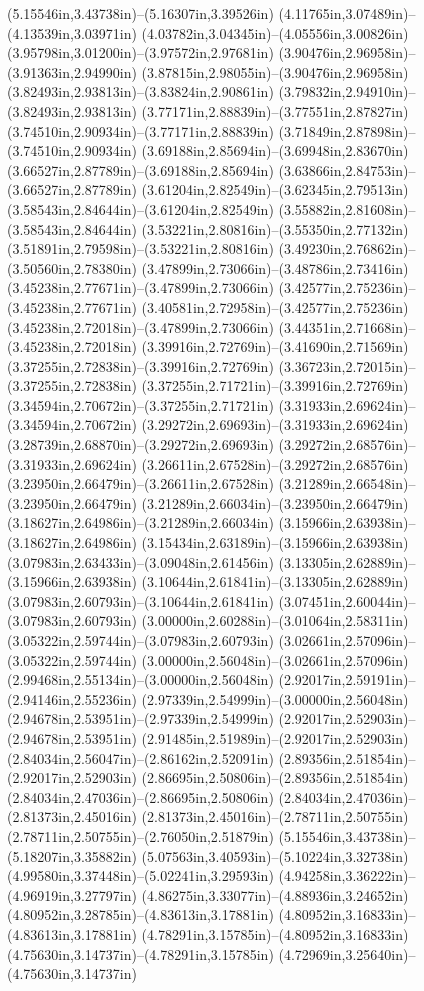 (5.15546in,3.43738in)--(5.16307in,3.39526in) (4.11765in,3.07489in)--(4.13539in,3.03971in) (4.03782in,3.04345in)--(4.05556in,3.00826in) (3.95798in,3.01200in)--(3.97572in,2.97681in) (3.90476in,2.96958in)--(3.91363in,2.94990in) (3.87815in,2.98055in)--(3.90476in,2.96958in) (3.82493in,2.93813in)--(3.83824in,2.90861in) (3.79832in,2.94910in)--(3.82493in,2.93813in) (3.77171in,2.88839in)--(3.77551in,2.87827in) (3.74510in,2.90934in)--(3.77171in,2.88839in) (3.71849in,2.87898in)--(3.74510in,2.90934in) (3.69188in,2.85694in)--(3.69948in,2.83670in) (3.66527in,2.87789in)--(3.69188in,2.85694in) (3.63866in,2.84753in)--(3.66527in,2.87789in) (3.61204in,2.82549in)--(3.62345in,2.79513in) (3.58543in,2.84644in)--(3.61204in,2.82549in) (3.55882in,2.81608in)--(3.58543in,2.84644in) (3.53221in,2.80816in)--(3.55350in,2.77132in) (3.51891in,2.79598in)--(3.53221in,2.80816in) (3.49230in,2.76862in)--(3.50560in,2.78380in) (3.47899in,2.73066in)--(3.48786in,2.73416in) (3.45238in,2.77671in)--(3.47899in,2.73066in) (3.42577in,2.75236in)--(3.45238in,2.77671in) (3.40581in,2.72958in)--(3.42577in,2.75236in) (3.45238in,2.72018in)--(3.47899in,2.73066in) (3.44351in,2.71668in)--(3.45238in,2.72018in) (3.39916in,2.72769in)--(3.41690in,2.71569in) (3.37255in,2.72838in)--(3.39916in,2.72769in) (3.36723in,2.72015in)--(3.37255in,2.72838in) (3.37255in,2.71721in)--(3.39916in,2.72769in) (3.34594in,2.70672in)--(3.37255in,2.71721in) (3.31933in,2.69624in)--(3.34594in,2.70672in) (3.29272in,2.69693in)--(3.31933in,2.69624in) (3.28739in,2.68870in)--(3.29272in,2.69693in) (3.29272in,2.68576in)--(3.31933in,2.69624in) (3.26611in,2.67528in)--(3.29272in,2.68576in) (3.23950in,2.66479in)--(3.26611in,2.67528in) (3.21289in,2.66548in)--(3.23950in,2.66479in) (3.21289in,2.66034in)--(3.23950in,2.66479in) (3.18627in,2.64986in)--(3.21289in,2.66034in) (3.15966in,2.63938in)--(3.18627in,2.64986in) (3.15434in,2.63189in)--(3.15966in,2.63938in) (3.07983in,2.63433in)--(3.09048in,2.61456in) (3.13305in,2.62889in)--(3.15966in,2.63938in) (3.10644in,2.61841in)--(3.13305in,2.62889in) (3.07983in,2.60793in)--(3.10644in,2.61841in) (3.07451in,2.60044in)--(3.07983in,2.60793in) (3.00000in,2.60288in)--(3.01064in,2.58311in) (3.05322in,2.59744in)--(3.07983in,2.60793in) (3.02661in,2.57096in)--(3.05322in,2.59744in) (3.00000in,2.56048in)--(3.02661in,2.57096in) (2.99468in,2.55134in)--(3.00000in,2.56048in) (2.92017in,2.59191in)--(2.94146in,2.55236in) (2.97339in,2.54999in)--(3.00000in,2.56048in) (2.94678in,2.53951in)--(2.97339in,2.54999in) (2.92017in,2.52903in)--(2.94678in,2.53951in) (2.91485in,2.51989in)--(2.92017in,2.52903in) (2.84034in,2.56047in)--(2.86162in,2.52091in) (2.89356in,2.51854in)--(2.92017in,2.52903in) (2.86695in,2.50806in)--(2.89356in,2.51854in) (2.84034in,2.47036in)--(2.86695in,2.50806in) (2.84034in,2.47036in)--(2.81373in,2.45016in) (2.81373in,2.45016in)--(2.78711in,2.50755in) (2.78711in,2.50755in)--(2.76050in,2.51879in) (5.15546in,3.43738in)--(5.18207in,3.35882in) (5.07563in,3.40593in)--(5.10224in,3.32738in) (4.99580in,3.37448in)--(5.02241in,3.29593in) (4.94258in,3.36222in)--(4.96919in,3.27797in) (4.86275in,3.33077in)--(4.88936in,3.24652in) (4.80952in,3.28785in)--(4.83613in,3.17881in) (4.80952in,3.16833in)--(4.83613in,3.17881in) (4.78291in,3.15785in)--(4.80952in,3.16833in) (4.75630in,3.14737in)--(4.78291in,3.15785in) (4.72969in,3.25640in)--(4.75630in,3.14737in) 